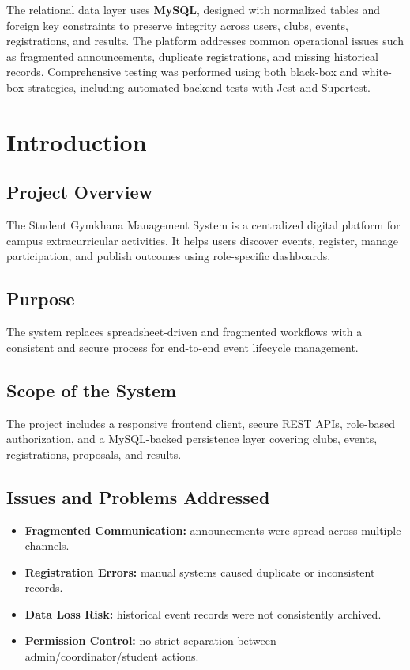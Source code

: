 \documentclass[12pt, a4paper]{article}
\begin{document}
The relational data layer uses \textbf{MySQL}, designed with normalized tables and foreign key constraints to preserve integrity across users, clubs, events, registrations, and results. The platform addresses common operational issues such as fragmented announcements, duplicate registrations, and missing historical records. Comprehensive testing was performed using both black-box and white-box strategies, including automated backend tests with Jest and Supertest.

\newpage
\tableofcontents
\newpage

\section{Introduction}
\subsection{Project Overview}
The Student Gymkhana Management System is a centralized digital platform for campus extracurricular activities. It helps users discover events, register, manage participation, and publish outcomes using role-specific dashboards.

\subsection{Purpose}
The system replaces spreadsheet-driven and fragmented workflows with a consistent and secure process for end-to-end event lifecycle management.

\subsection{Scope of the System}
The project includes a responsive frontend client, secure REST APIs, role-based authorization, and a MySQL-backed persistence layer covering clubs, events, registrations, proposals, and results.

\subsection{Issues and Problems Addressed}
\begin{itemize}
    \item \textbf{Fragmented Communication:} announcements were spread across multiple channels.
    \item \textbf{Registration Errors:} manual systems caused duplicate or inconsistent records.
    \item \textbf{Data Loss Risk:} historical event records were not consistently archived.
    \item \textbf{Permission Control:} no strict separation between admin/coordinator/student actions.
\end{itemize}
\end{document}

